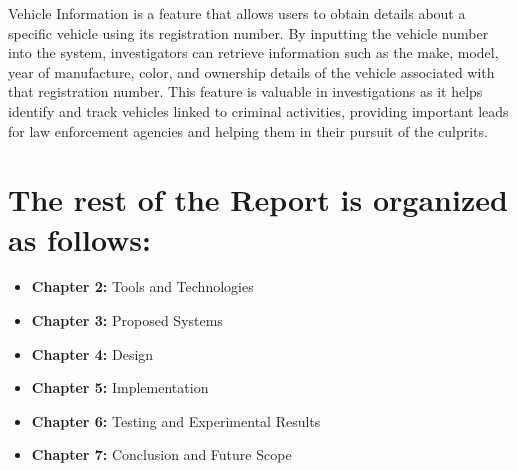 Vehicle Information is a feature that allows users to obtain details about a specific vehicle using its registration number. By inputting the vehicle number into the system, investigators can retrieve information such as the make, model, year of manufacture, color, and ownership details of the vehicle associated with that registration number. This feature is valuable in investigations as it helps identify and track vehicles linked to criminal activities, providing important leads for law enforcement agencies and helping them in their pursuit of the culprits.

\section*{The rest of the Report is organized as follows:}
\begin{itemize}
    \item \textbf{Chapter 2:} Tools and Technologies
    \item \textbf{Chapter 3:} Proposed Systems
    \item \textbf{Chapter 4:} Design
    \item \textbf{Chapter 5:} Implementation
    \item \textbf{Chapter 6:} Testing and Experimental Results
    \item \textbf{Chapter 7:} Conclusion and Future Scope
\end{itemize}

\newpage


